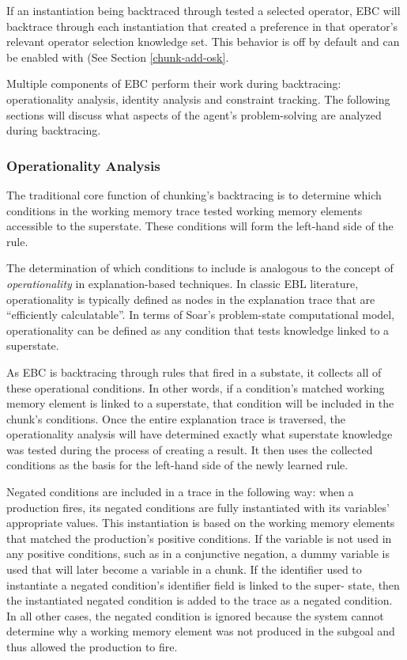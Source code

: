 If an instantiation being backtraced through tested a selected operator, EBC will backtrace through each instantiation that created a preference in that operator's relevant operator selection knowledge set.  This behavior is off by default and can be enabled with  (See Section \ref{chunk-add-osk}.

Multiple components of EBC perform their work during backtracing:  operationality analysis, identity analysis and constraint tracking.  The following sections will discuss what aspects of the agent's problem-solving are analyzed during backtracing.

\subsubsection{Operationality Analysis}
\label{CHUNKING-during-backtracing-operationality}

The traditional core function of chunking's backtracing is to determine which conditions in the working memory trace tested working memory elements accessible to the superstate.  These conditions will form the left-hand side of the rule.

The determination of which conditions to include is analogous to the concept of \textit{operationality} in explanation-based techniques. In classic EBL literature, operationality is typically defined as nodes in the explanation trace that are ``efficiently calculatable''.  In terms of Soar's problem-state computational model, operationality can be defined as any condition that tests knowledge linked to a superstate.  

As EBC is backtracing through rules that fired in a substate, it collects all of these operational conditions.  In other words, if a condition's matched working memory element is linked to a superstate, that condition will be included in the chunk's conditions.  Once the entire explanation trace is traversed, the operationality analysis will have determined exactly what superstate knowledge was tested during the process of creating a result. It then uses the collected conditions as the basis for the left-hand side of the newly learned rule.  

Negated conditions are included in a trace in the following way: when a production fires, its negated conditions are fully instantiated with its variables' appropriate values. This instantiation is based on the working memory elements that matched the production's positive conditions. If the variable is not used in any positive conditions, such as in a conjunctive negation, a dummy variable is used that will later become a variable in a chunk.  If the identifier used to instantiate a negated condition's identifier field is linked to the super- state, then the instantiated negated condition is added to the trace as a negated condition. In all other cases, the negated condition is ignored because the system cannot determine why a working memory element was not produced in the subgoal and thus allowed the production to fire. 

